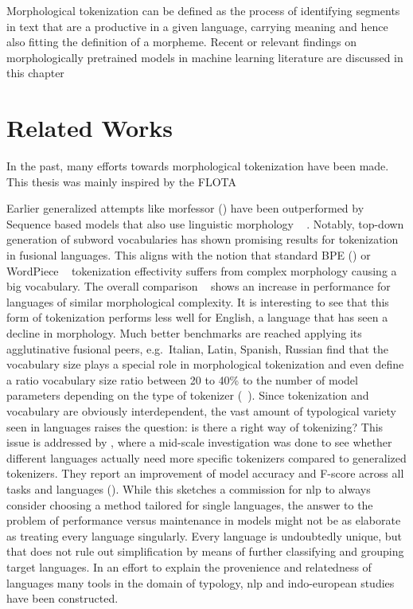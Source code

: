 
Morphological tokenization can be defined as the process of identifying segments in text that are a productive in a given language, carrying meaning and hence also fitting the definition of a morpheme.
Recent or relevant findings on morphologically pretrained models in machine learning literature are discussed in this chapter


\section{Related Works}
\label{sec:related-works}

In the past, many efforts towards morphological tokenization have been made.
This thesis was mainly inspired by the FLOTA

Earlier generalized attempts like morfessor (\cite{morfessor}) have been outperformed by Sequence based models that also use linguistic morphology ~\cite{subwordvsmorfessor} .
Notably, top-down generation of subword vocabularies has shown promising results for tokenization in fusional languages.
This aligns with the notion that standard BPE (\cite{BPE}) or WordPiece ~\cite{WORDPIECEGOOGLE} tokenization effectivity suffers from complex morphology causing a big vocabulary.
The overall comparison ~\cite[134]{subwordvsmorfessor} shows an increase in performance for languages of similar morphological complexity.
It is interesting to see that this form of tokenization performs less well for English, a language that has seen a decline in morphology.
Much better benchmarks are reached applying  its agglutinative fusional peers, e.g.\ Italian, Latin, Spanish, Russian
\citeauthor{TOKENIZATIONIMPACT} find that the vocabulary size plays a special role in morphological tokenization and even define a ratio vocabulary size ratio between 20 to 40\% to the number of model parameters depending on the type of tokenizer (~\cite[11--12]{TOKENIZATIONIMPACT}).
Since tokenization and vocabulary are obviously interdependent, the vast amount of typological variety seen in languages raises the question: is there a right way of tokenizing?
This issue is addressed by \citeauthor{MONOLINGUAL}, where a mid-scale investigation was done to see whether different languages actually need more specific tokenizers compared to generalized tokenizers.
They report an improvement of model accuracy and F-score across all tasks and languages (\cite{MONOLINGUAL}).
While this sketches a commission for \ac{nlp} to always consider choosing a method tailored for single languages, the answer to the problem of performance versus maintenance in models might not be as elaborate as treating every language singularly.
Every language is undoubtedly unique, but that does not rule out simplification by means of further classifying and grouping target languages.
In an effort to explain the provenience and relatedness of languages many tools in the domain of typology, \ac{nlp} and indo-european studies have been constructed.

